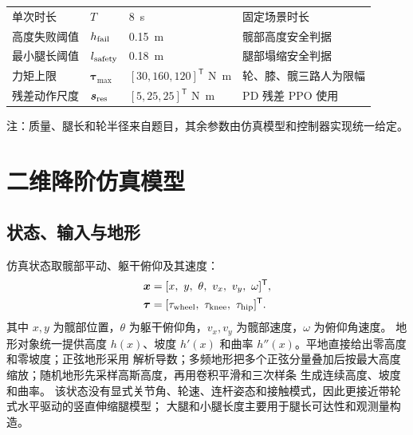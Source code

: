 \documentclass[UTF8,12pt,a4paper,fontset=none]{ctexart}
\begin{document}
\begin{table}[htbp]
\begin{threeparttable}
\begin{tabularx}{\linewidth}{lC{2.4cm}C{2.8cm}Y}
单次时长 & $T$ & \SI{8}{s} & 固定场景时长 \\
高度失败阈值 & $h_{\rm fail}$ & \SI{0.15}{m} & 髋部高度安全判据 \\
最小腿长阈值 & $l_{\rm safety}$ & \SI{0.18}{m} & 腿部塌缩安全判据 \\
力矩上限 & $\bm\tau_{\max}$ & $[30,160,120]^{\mathsf T}$ \si{N.m} & 轮、膝、髋三路人为限幅 \\
残差动作尺度 & $\bm s_{\rm res}$ & $[5,25,25]^{\mathsf T}$ \si{N.m} & PD 残差 PPO 使用 \\
\bottomrule
\end{tabularx}
\begin{tablenotes}[flushleft]\footnotesize
\item 注：质量、腿长和轮半径来自题目，其余参数由仿真模型和控制器实现统一给定。
\end{tablenotes}
\end{threeparttable}
\end{table}

\section{二维降阶仿真模型}

\subsection{状态、输入与地形}
仿真状态取髋部平动、躯干俯仰及其速度：
\begin{align}
\bm x&=[x,\ y,\ \theta,\ v_x,\ v_y,\ \omega]^{\mathsf T},\\
\bm\tau&=[\tau_{\rm wheel},\ \tau_{\rm knee},\ \tau_{\rm hip}]^{\mathsf T}.
\end{align}
其中 $x,y$ 为髋部位置，$\theta$ 为躯干俯仰角，$v_x,v_y$ 为髋部速度，$\omega$ 为俯仰角速度。
地形对象统一提供高度 $h(x)$、坡度 $h'(x)$ 和曲率 $h''(x)$。平地直接给出零高度和零坡度；正弦地形采用
解析导数；多频地形把多个正弦分量叠加后按最大高度缩放；随机地形先采样高斯高度，再用卷积平滑和三次样条
生成连续高度、坡度和曲率。
该状态没有显式关节角、轮速、连杆姿态和接触模式，因此更接近带轮式水平驱动的竖直伸缩腿模型；
大腿和小腿长度主要用于腿长可达性和观测量构造。
\end{document}
